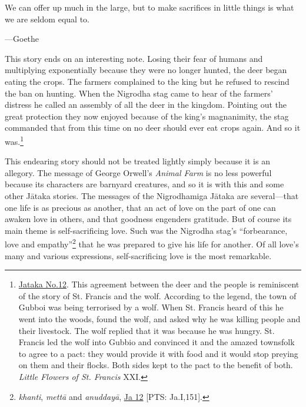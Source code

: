 \documentclass[10pt, openright]{book}
\newenvironment{epigram-2}%
{%
\setstretch{1.4}
\vspace{1em}
\noindent
\quoting[leftmargin=2cm,rightmargin=2cm]%
\begin{itshape}
\large
}%
{\end{itshape}\endquoting
}%
\newenvironment{epigram-2-cite}%
{%
\quoting[leftmargin=2cm,rightmargin=2cm]%
\noindent\normal\hspace*{\fill} 
}%
{\endquoting
}%
\begin{document}
\begin{epigram-2}
We can offer up much in the large, but to make sacrifices in little things is what we are seldom equal to.
\end{epigram-2}
\begin{epigram-2-cite}
—Goethe
\end{epigram-2-cite}

This story ends on an interesting note. Losing their fear of humans and multiplying exponentially because they were no longer hunted, the deer began eating the crops. The farmers complained to the king but he refused to rescind the ban on hunting. When the Nigrodha stag came to hear of the farmers’ distress he called an assembly of all the deer in the kingdom. Pointing out the great protection they now enjoyed because of the king’s magnanimity, the stag commanded that from this time on no deer should ever eat crops again. And so it was.\footnote {\href{https://suttacentral.net/ja12/en/chalmers}{Jataka No.12}. This agreement between the deer and the people is reminiscent of the story of St. Francis and the wolf. According to the legend, the town of Gubboi was being terrorised by a wolf. When St. Francis heard of this he went into the woods, found the wolf, and asked why he was killing people and their livestock. The wolf replied that it was because he was hungry. St. Francis led the wolf into Gubbio and convinced it and the amazed townsfolk to agree to a pact: they would provide it with food and it would stop preying on them and their flocks. Both sides kept to the pact to the benefit of both. \textit{Little Flowers of St. Francis} XXI.}


This endearing story should not be treated lightly simply because it is an allegory. The message of George Orwell’s \textit{Animal Farm} is no less powerful because its characters are barnyard creatures, and so it is with this and some other Jātaka stories. The messages of the Nigrodhamiga Jātaka are several—that one life is as precious as another, that an act of love on the part of one can awaken love in others, and that goodness engenders gratitude. But of course its main theme is self-sacrificing love. Such was the Nigrodha stag’s “forbearance, love and empathy”\footnote {\textit{khanti}, \textit{mettā} and \textit{anuddayā}, \href{https://suttacentral.net/ja12/en/chalmers?reference=main/pts#pts-vp-pli151}{Ja 12} [PTS: Ja.I,151].} that he was prepared to give his life for another. Of all love’s many and various expressions, self-sacrificing love is the most remarkable.
\end{document}
